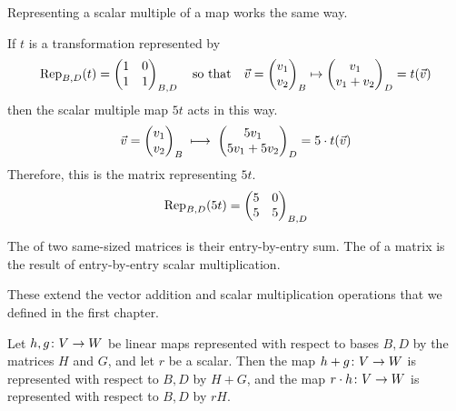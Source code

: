 Representing a scalar multiple of a map works the same way.

\begin{example}
If \( t \) is a transformation represented by
\begin{equation*}
  \rep{t}{B,D}
  =
    \begin{pmatrix}
      1  &0  \\
      1  &1
    \end{pmatrix}_{B,D}
  \quad\text{so that}\quad
  \vec{v}=\colvec{v_1 \\ v_2}_B\mapsto \colvec{v_1 \\ v_1+v_2}_D=t(\vec{v})
\end{equation*}
then the scalar multiple map $5t$ acts in this way.
\begin{equation*}
   \vec{v}=\colvec{v_1 \\ v_2}_B
     \;\longmapsto\; 
   \colvec{5v_1 \\ 5v_1+5v_2}_D=5\cdot t(\vec{v})
\end{equation*}
Therefore, this is the matrix representing $5t$.
\begin{equation*}
  \rep{5t}{B,D}
  =
    \begin{pmatrix}
      5  &0  \\
      5  &5
    \end{pmatrix}_{B,D}
\end{equation*}
\end{example}

\begin{definition} \label{def:SumScalarProdMats}
The  of two
same-sized matrices is their entry-by-entry sum.
The %
 of a matrix is the
result of entry-by-entry scalar multiplication.
\end{definition}

\begin{remark}
These extend the vector addition and scalar
multiplication operations that we defined in the first chapter.
\end{remark} 

\begin{theorem}  \label{th:MatOpsRepMapOps}
Let \( \map{h,g}{V}{W} \) be linear maps represented with respect to
bases \( B,D \) by the matrices \( H \) and \( G \), and let $r$ be a scalar.
Then the map \( \map{h+g}{V}{W} \) is represented with respect to \( B,D \)
by \( H+G \), and the map
\( \map{r\cdot h}{V}{W} \) is represented with respect to \( B,D \) by
\( rH \).
\end{theorem}


